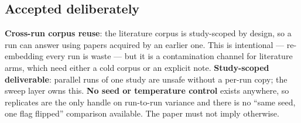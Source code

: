 \subsection{Accepted deliberately}

\textbf{Cross-run corpus reuse}: the literature corpus is study-scoped by
design, so a run can answer using papers acquired by an earlier one. This is
intentional --- re-embedding every run is waste --- but it is a contamination
channel for literature arms, which need either a cold corpus or an explicit
note. \textbf{Study-scoped deliverable}: parallel runs of one study are unsafe
without a per-run copy; the sweep layer owns this. \textbf{No seed or
temperature control} exists anywhere, so replicates are the only handle on
run-to-run variance and there is no ``same seed, one flag flipped'' comparison
available. The paper must not imply otherwise.
